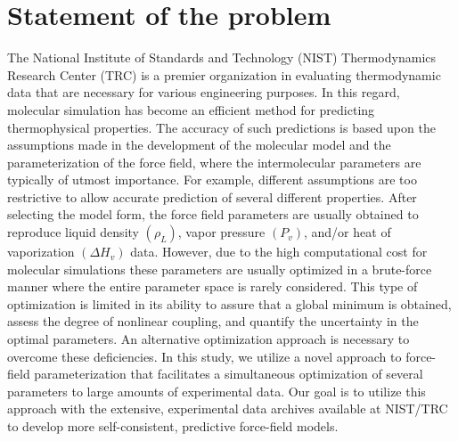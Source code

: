 \documentclass[12pt]{article}
\begin{document}
\section{Statement of the problem}

The National Institute of Standards and Technology (NIST) Thermodynamics Research Center (TRC) is a premier organization in evaluating thermodynamic data that are necessary for various engineering purposes. In this regard, molecular simulation has become an efficient method for predicting thermophysical properties. The accuracy of such predictions is based upon the assumptions made in the development of the molecular model and the parameterization of the force field, where the intermolecular parameters are typically of utmost importance. For example, different assumptions are too restrictive to allow accurate prediction of several different properties. After selecting the model form, the force field parameters are usually obtained to reproduce liquid density $(\rho_L)$, vapor pressure $(P_v)$, and/or heat of vaporization $(\Delta H_v)$ data. However, due to the high computational cost for molecular simulations these parameters are usually optimized in a brute-force manner where the entire parameter space is rarely considered. This type of optimization is limited in its ability to assure that a global minimum is obtained, assess the degree of nonlinear coupling, and quantify the uncertainty in the optimal parameters. An alternative optimization approach is necessary to overcome these deficiencies. In this study, we utilize a novel approach to force-field parameterization that facilitates a simultaneous optimization of several parameters to large amounts of experimental data. Our goal is to utilize this approach with the extensive, experimental data archives available at NIST/TRC to develop more self-consistent, predictive force-field models.

\end{document}
